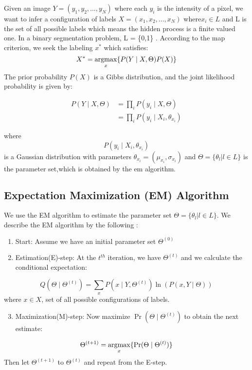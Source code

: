 Given an image \(Y=(y_1, y_2,..., y_N)\) where each \(y_i\) is the intensity of a pixel, we want to infer a configuration of labels \(X = (x_1,x_2,...,x_N)\) where\(x_i \in L\)  and L is the set of all possible labels which means the hidden process is a finite valued one\cite {monfrini2003image}. In a binary segmentation problem, L = \{0,1\} . According to the \gls{map} criterion, we seek the labeling \(x^*\) which satisfies:
\begin{equation}
X^*=\operatorname*{argmax}_x  \{ P( Y \mid X, \Theta)P(X)\} 
\end{equation}
The prior probability \(P(X)\) is a Gibbs distribution, and the joint likelihood probability is given by:

\begin{equation}\label{eq1}
\begin{split}
P( Y \mid X,\Theta) & =\prod_{i}^{ } P( y_i \mid X,\Theta)\\
& =\prod_{i}^{ }P( y_i \mid X_i,\theta_{x_i})
\end{split}
\end{equation}

where \[P( y_i \mid X_i,\theta_{x_i})\] is a Gaussian distribution with parameters
\(\theta_{x_i}=(\mu_{x_i} , \sigma_{x_i})\) and \(\Theta=\{\theta_l\lvert l \in L\}\)
is the parameter set,which is obtained by the \gls{em} algorithm.

\subsection{Expectation Maximization (EM) Algorithm}
We use the EM algorithm to estimate the parameter set \(\Theta=\{\theta_l\lvert l \in L\}\). We describe the EM algorithm by the following \cite{bordes2007stochastic}:

\begin{enumerate}
	\item Start: Assume we have an initial parameter set \(\Theta^{(0)}\)
	\item  Estimation(E)-step: At the \(t^{th}\) iteration, we have  \(\Theta^{(t)}\) and we calculate the conditional expectation:
\end{enumerate}
\begin{equation}
Q(\Theta \mid \Theta^{(t)}) = {\sum\limits_{x} }P( x \mid Y,\Theta^{(t)})\ln (P( x,Y \mid \Theta))
\end{equation}
where $ x \in X$, set of all possible configurations of labels.

\begin{enumerate}
	\setcounter{enumi}{2}
	\item Maximization(M)-step: Now maximize \(\Pr(\Theta \mid \Theta^{(t)})\) to obtain the next
	estimate:
\end{enumerate}
\begin{equation}
\Theta^{(t+1)}=\operatorname*{argmax}_x\{\Pr(\Theta \mid \Theta^{(t)})\} 
\end{equation}
Then let \(\Theta^{(t+1)}\) to  \(\Theta^{(t)}\) and repeat from the E-step.


